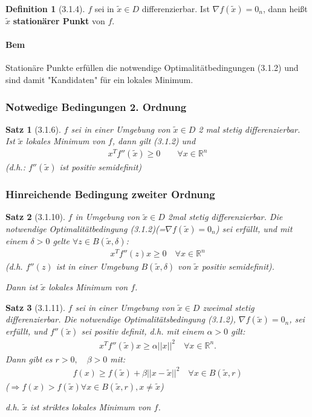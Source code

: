 \documentclass[ngerman,halfparskip]{scrartcl}
\newtheorem*{satz}{Satz}
\theoremstyle{definition}
\newtheorem*{defin}{Definition}
\def\R{\mathbb R}
\begin{document}
\begin{defin}[3.1.4]  $f$ sei in $\tilde x \in D $ differenzierbar. Ist $\nabla f(\tilde x)=0_n$, dann heißt $\tilde x$ \textbf{stationärer Punkt} von $f$.
\end{defin}
\paragraph{Bem} Stationäre Punkte erfüllen die notwendige Optimalitätbedingungen (3.1.2) und sind damit "Kandidaten" für ein lokales Minimum.
\subsubsection{Notwedige Bedingungen 2. Ordnung}
\begin{satz}[3.1.6] $f$ sei in einer Umgebung von $\tilde x \in D$ 2 mal stetig differenzierbar. Ist $\tilde x$ lokales Minimum von $f$, dann gilt (3.1.2) und 
\begin{gather}\tag{3.1.3} x^Tf''(\tilde x)\geq 0 \qquad \forall x\in\R^n
\end{gather}
(d.h.: $f''(\tilde x)$ ist positiv semidefinit)
\end{satz}

\subsubsection{Hinreichende Bedingung zweiter Ordnung}
\begin{satz}[3.1.10] $f$ in Umgebung von $\tilde x \in D$ 2mal stetig differenzierbar. Die notwendige Optimalitätbedingung (3.1.2)(=$\nabla f(\tilde x)=0_n$) sei erfüllt, und mit einem $\delta >0$ gelte $\forall z\in B(\tilde x, \delta)$:
\begin{gather}\tag{3.1.4} x^Tf''(z)x \geq 0 \quad \forall x\in\R^n\end{gather} (d.h. $f''(z)$ ist in einer Umgebung $B(\tilde x, \delta)$ von $\tilde x$ positiv semidefinit). 

Dann ist $\tilde x$ lokales Minimum von $f$.
\end{satz}

\begin{satz}[3.1.11] $ f $ sei in einer Umgebung von $ \tilde x \in D $ zweimal stetig differenzierbar. Die notwendige Optimalitätsbedingung (3.1.2), $ \nabla f(\tilde x)=0_n $, sei erfüllt, und $ f''(\tilde{x}) $ sei positiv definit, d.h. mit einem $ \alpha > 0 $ gilt:
\begin{gather}\tag{3.1.5} x^Tf''(\tilde x )x \geq \alpha ||x||^2\quad \forall x \in \R^n.\end{gather}
Dann gibt es $ r>0, \quad \beta >0 $ mit: 
\begin{gather*} f(x)\geq f(\tilde x)+\beta ||x-\tilde x||^2 \quad \forall x\in B(\tilde x, r)\end{gather*}
($ \Rightarrow f(x)> f(\tilde x) \forall x \in  B(\tilde x, r), x\neq\tilde x$)

d.h. $ \tilde x $ ist striktes lokales Minimum von $ f $.
\end{satz}
\end{document}

